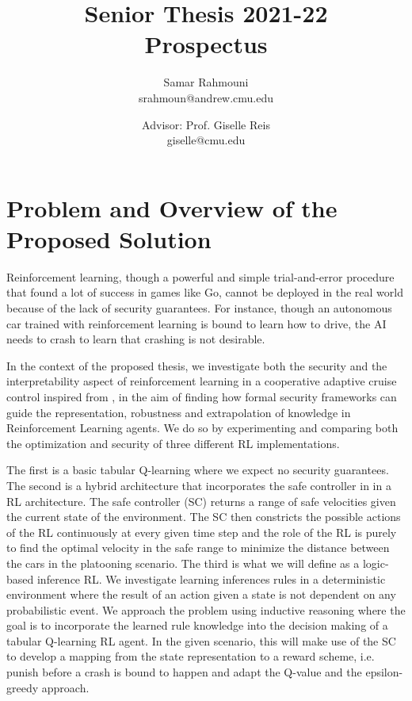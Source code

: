 \documentclass[a4paper,11pt]{article}
\author{%
  \begin{minipage}[t]{0.47\textwidth}
    \centering
    Samar Rahmouni \\ srahmoun@andrew.cmu.edu
  \end{minipage}
  \and
  \begin{minipage}[t]{0.45\textwidth}
    \centering
    Advisor: Prof. Giselle Reis \\ giselle@cmu.edu
  \end{minipage}%
  \vspace*{2ex}
}
\date{}
\title{{\Large\sc Senior Thesis 2021-22\\[2ex]}{\LARGE\bf Prospectus\vspace*{3ex}}}
\begin{document}
\maketitle 

\section{Problem and Overview of the Proposed Solution}
Reinforcement learning, though a powerful and simple trial-and-error procedure that found a lot of success in games like Go, cannot be deployed in the real world 
because of the lack of security guarantees. For instance, though an autonomous car trained with reinforcement learning is bound to learn how to drive, the AI needs to crash 
to learn that crashing is not desirable. 

\medskip

In the context of the proposed thesis, we investigate both the security and the interpretability aspect of reinforcement learning in a cooperative adaptive cruise control inspired from \cite{vnc20},
in the aim of finding how formal security frameworks can guide the representation, robustness and extrapolation of knowledge in Reinforcement
Learning agents. We do so by experimenting and comparing both the optimization and security of three different RL implementations. 

\medskip

The first is a basic tabular Q-learning where we expect no security guarantees. The second is a hybrid architecture that incorporates the safe controller in \cite{vnc20} in a RL architecture. 
The safe controller (SC) returns a range of safe velocities given the current state of the environment. The SC then constricts the possible actions of the RL continuously at every given time step and the role of the RL is purely 
to find the optimal velocity in the safe range to minimize the distance between the cars in the platooning scenario. The third is what we will define as a logic-based inference RL. We investigate learning inferences rules in a deterministic environment 
where the result of an action given a state is not dependent on any probabilistic event. We approach the problem using inductive reasoning where the goal is to incorporate the learned rule knowledge into the decision making of a tabular Q-learning RL agent. 
In the given scenario, this will make use of the SC to develop a mapping from the state representation to a reward scheme, i.e. punish before a crash is bound to happen and adapt the Q-value and the epsilon-greedy approach. 
\end{document}
